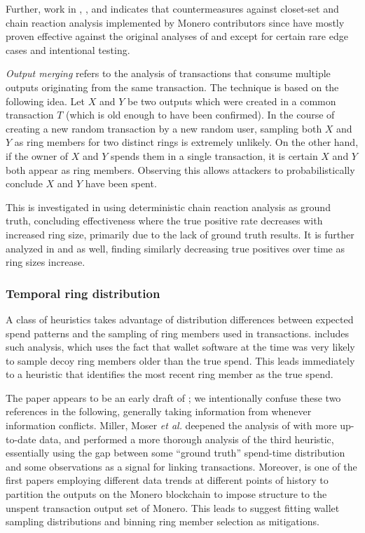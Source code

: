 \documentclass{article}
\theoremstyle{definition}
\begin{document}
Further, work in \cite{kedziora2020practical}, \cite{hinteregger2018monero}, and \cite{ye2020alt} indicates that countermeasures against closet-set and chain reaction analysis implemented by Monero contributors since \cite{noether2014note} have mostly proven effective against the original analyses of \cite{moser2017empirical} and \cite{kumar2017traceability} except for certain rare edge cases and intentional testing.

\textit{Output merging} refers to the analysis of transactions that consume multiple outputs originating from the same transaction.
The technique is based on the following idea.
Let $X$ and $Y$ be two outputs which were created in a common transaction $T$ (which is old enough to have been confirmed).
In the course of creating a new random transaction by a new random user, sampling both $X$ and $Y$ as ring members for two distinct rings is extremely unlikely.
On the other hand, if the owner of $X$ and $Y$ spends them in a single transaction, it is certain $X$ and $Y$ both appear as ring members.
Observing this allows attackers to probabilistically conclude $X$ and $Y$ have been spent.

This is investigated in \cite{kumar2017traceability} using deterministic chain reaction analysis as ground truth, concluding effectiveness where the true positive rate decreases with increased ring size, primarily due to the lack of ground truth results.
It is further analyzed in \cite{christensen2018comparative} and \cite{hinteregger2018monero} as well, finding similarly decreasing true positives over time as ring sizes increase.


\subsubsection{Temporal ring distribution}

A class of heuristics takes advantage of distribution differences between expected spend patterns and the sampling of ring members used in transactions.
\cite{kumar2017traceability} includes such analysis, which uses the fact that wallet software at the time was very likely to sample decoy ring members older than the true spend.
This leads immediately to a heuristic that identifies the most recent ring member as the true spend.

The paper \cite{miller2017empirical} appears to be an early draft of \cite{moser2017empirical}; we intentionally confuse these two references in the following, generally taking information from \cite{moser2017empirical} whenever information conflicts.
Miller, Moser \textit{et al.} deepened the analysis of \cite{kumar2017traceability} with more up-to-date data, and performed a more thorough analysis of the third heuristic, essentially using the gap between some ``ground truth'' spend-time distribution and some observations as a signal for linking transactions.
Moreover, \cite{moser2017empirical} is one of the first papers employing different data trends at different points of history to partition the outputs on the Monero blockchain to impose structure to the unspent transaction output set of Monero.
This leads \cite{moser2017empirical} to suggest fitting wallet sampling distributions and binning ring member selection as mitigations.
\end{document}
